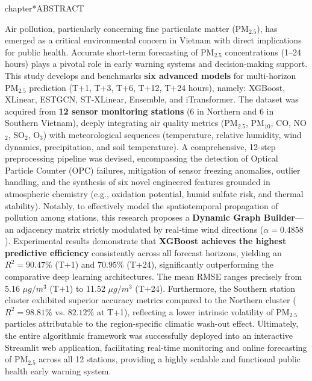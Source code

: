 chapter*{ABSTRACT}

Air pollution, particularly concerning fine particulate matter (PM$_{2.5}$), has emerged as a critical environmental concern in Vietnam with direct implications for public health. Accurate short-term forecasting of PM$_{2.5}$ concentrations (1–24 hours) plays a pivotal role in early warning systems and decision-making support. This study develops and benchmarks \textbf{six advanced models} for multi-horizon PM$_{2.5}$ prediction (T+1, T+3, T+6, T+12, T+24 hours), namely: XGBoost, XLinear, ESTGCN, ST-XLinear, Ensemble, and iTransformer. The dataset was acquired from \textbf{12 sensor monitoring stations} (6 in Northern and 6 in Southern Vietnam), deeply integrating air quality metrics (PM$_{2.5}$, PM$_{10}$, CO, NO$_2$, SO$_2$, O$_3$) with meteorological sequences (temperature, relative humidity, wind dynamics, precipitation, and soil temperature). A comprehensive, 12-step preprocessing pipeline was devised, encompassing the detection of Optical Particle Counter (OPC) failures, mitigation of sensor freezing anomalies, outlier handling, and the synthesis of six novel engineered features grounded in atmospheric chemistry (e.g., oxidation potential, humid sulfate risk, and thermal stability). Notably, to effectively model the spatiotemporal propagation of pollution among stations, this research proposes a \textbf{Dynamic Graph Builder}—an adjacency matrix strictly modulated by real-time wind directions ($\alpha = 0.4858$). Experimental results demonstrate that \textbf{XGBoost achieves the highest predictive efficiency} consistently across all forecast horizons, yielding an $R^2 = 90.47\%$ (T+1) and $70.95\%$ (T+24), significantly outperforming the comparative deep learning architectures. The mean RMSE ranges precisely from 5.16 $\mu g/m^3$ (T+1) to 11.52 $\mu g/m^3$ (T+24). Furthermore, the Southern station cluster exhibited superior accuracy metrics compared to the Northern cluster ($R^2 = 98.81\%$ vs. $82.12\%$ at T+1), reflecting a lower intrinsic volatility of PM$_{2.5}$ particles attributable to the region-specific climatic wash-out effect. Ultimately, the entire algorithmic framework was successfully deployed into an interactive Streamlit web application, facilitating real-time monitoring and online forecasting of PM$_{2.5}$ across all 12 stations, providing a highly scalable and functional public health early warning system.